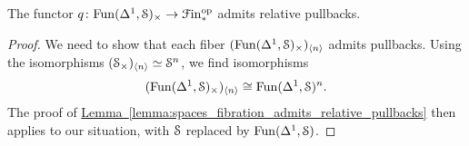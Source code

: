 \documentclass[main.tex]{subfiles}
\begin{document}
\begin{lemma}
  The functor $q\colon \Fun(\Delta^{1}, \S)_{\times} \to \Finp\op$ admits relative pullbacks.
\end{lemma}
\begin{proof}
  We need to show that each fiber $(\Fun(\Delta^{1}, \S)_{\times})_{\langle n \rangle}$ admits pullbacks. Using the isomorphisms $(\S_{\times})_{\langle n \rangle} \simeq \S^{n}$, we find isomorphisms 
  \begin{equation*}
    (\Fun(\Delta^{1}, \S)_{\times})_{\langle n \rangle} \cong \Fun(\Delta^{1}, \S)^{n}.
  \end{equation*}
  The proof of \hyperref[lemma:spaces_fibration_admits_relative_pullbacks]{Lemma~\ref*{lemma:spaces_fibration_admits_relative_pullbacks}} then applies to our situation, with $\S$ replaced by $\Fun(\Delta^{1}, \S)$.
\end{proof}
\end{document}
